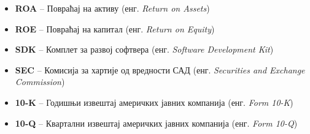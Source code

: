 \begin{itemize}
    \item \textbf{ROA} -- Повраћај на активу (енг. \textit{Return on Assets})
    \item \textbf{ROE} -- Повраћај на капитал (енг. \textit{Return on Equity})
    \item \textbf{SDK} -- Комплет за развој софтвера (енг. \textit{Software Development Kit})
    \item \textbf{SEC} -- Комисија за хартије од вредности САД (енг. \textit{Securities and Exchange Commission})
    \item \textbf{10-K} -- Годишњи извештај америчких јавних компанија (енг. \textit{Form 10-K})
    \item \textbf{10-Q} -- Квартални извештај америчких јавних компанија (енг. \textit{Form 10-Q})
\end{itemize}

\listoftables

\listoffigures

